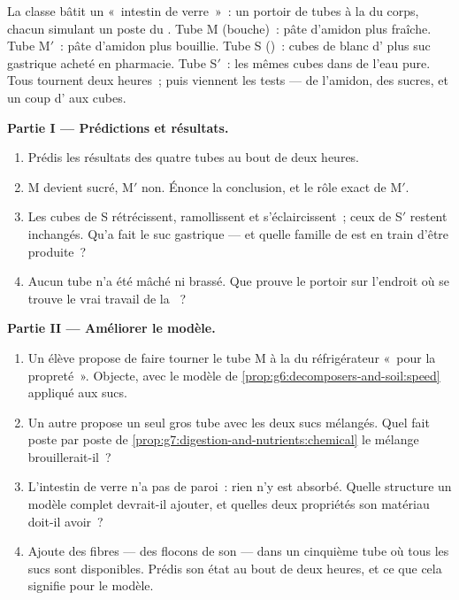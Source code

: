 \begin{problem}\label{pb:g7:digestion-and-nutrients:1}
La classe bâtit un «~intestin de verre~»~: un portoir de tubes à la
 du corps, chacun simulant un poste du .
Tube M (bouche)~: pâte d'amidon plus  fraîche. Tube M$'$~:
pâte d'amidon plus  bouillie. Tube S ()~: cubes de
blanc d' plus suc gastrique acheté en pharmacie. Tube S$'$~: les
mêmes cubes dans de l'eau pure. Tous tournent deux heures~; puis
viennent les tests --- de l'amidon, des sucres, et un coup d' aux
cubes.

\medskip\noindent\textbf{Partie I --- Prédictions et
résultats.}
\begin{enumerate}
  \item Prédis les résultats des quatre tubes au bout de deux
        heures.
  \item M devient sucré, M$'$ non. Énonce la conclusion, et le rôle
        exact de M$'$.
  \item Les cubes de S rétrécissent, ramollissent et s'éclaircissent~;
        ceux de S$'$ restent inchangés. Qu'a fait le suc gastrique
        --- et quelle famille de  est en train d'être
        produite~?
  \item Aucun tube n'a été mâché ni brassé. Que prouve le portoir
        sur l'endroit où se trouve le vrai travail de la ~?
\end{enumerate}

\medskip\noindent\textbf{Partie II --- Améliorer le modèle.}
\begin{enumerate}[resume]
  \item Un élève propose de faire tourner le tube M à la
         du réfrigérateur «~pour la propreté~». Objecte,
        avec le modèle de
        \cref{prop:g6:decomposers-and-soil:speed} appliqué aux
        sucs.
  \item Un autre propose un seul gros tube avec les deux sucs
        mélangés. Quel fait poste par poste de
        \cref{prop:g7:digestion-and-nutrients:chemical} le mélange
        brouillerait-il~?
  \item L'intestin de verre n'a pas de paroi~: rien n'y est absorbé.
        Quelle structure un modèle complet devrait-il ajouter, et
        quelles deux propriétés son matériau doit-il avoir~?
  \item Ajoute des fibres --- des flocons de son --- dans un
        cinquième tube où tous les sucs sont disponibles. Prédis son
        état au bout de deux heures, et ce que cela signifie pour le
        modèle.
\end{enumerate}


\end{problem}

